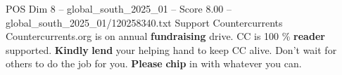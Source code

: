 \begin{textsample}{POS Dim 8 – global\_south\_2025\_01 – Score 8.00 – global\_south\_2025\_01/120258340.txt}
Support Countercurrents Countercurrents.org is on annual \textbf{fundraising} drive.
CC is 100 \% \textbf{reader} supported. \textbf{Kindly} \textbf{lend} your helping hand to keep CC alive.
Don't wait for others to do the job for you. \textbf{Please} \textbf{chip} in with whatever you can.

\end{textsample}

